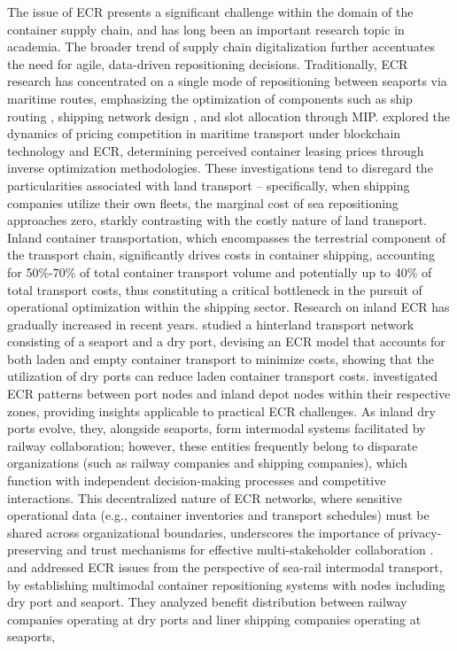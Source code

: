 \documentclass[preprint,12pt]{elsarticle}
\begin{document}
The issue of ECR presents a significant challenge within the domain of the container supply chain, and has long been an important research topic in academia. The broader trend of supply chain digitalization \citep{huImpactSupplyChain2026} further accentuates the need for agile, data-driven repositioning decisions. Traditionally, ECR research has concentrated on a single mode of repositioning between seaports via maritime routes, emphasizing the optimization of components such as ship routing \citep{xiangLinerFleetDeployment2024,xiangTacticalVesselDeployment2024,xuEmptyContainerRepositioning2024}, shipping network design \citep{kuzmiczContainerDepotLocation2020, shanExactAlgorithmInland2020, zhangTacticalOperationalCooperative2019}, and slot allocation \citep{liangDynamicContainerSlot2024} through MIP. \citet{yuPricingCompetitionMaritime2024} explored the dynamics of pricing competition in maritime transport under blockchain technology and ECR, determining perceived container leasing prices through inverse optimization methodologies. These investigations tend to disregard the particularities associated with land transport – specifically, when shipping companies utilize their own fleets, the marginal cost of sea repositioning approaches zero, starkly contrasting with the costly nature of land transport. Inland container transportation, which encompasses the terrestrial component of the transport chain, significantly drives costs in container shipping, accounting for 50\%-70\% of total container transport volume and potentially up to 40\% of total transport costs, thus constituting a critical bottleneck in the pursuit of operational optimization within the shipping sector. Research on inland ECR has gradually increased in recent years. \citet{faziMultitripContainerDrayage2023} studied a hinterland transport network consisting of a seaport and a dry port, devising an ECR model that accounts for both laden and empty container transport to minimize costs, showing that the utilization of dry ports can reduce laden container transport costs. \citet{caiJointOptimizationEmpty2024} investigated ECR patterns between port nodes and inland depot nodes within their respective zones, providing insights applicable to practical ECR challenges. As inland dry ports evolve, they, alongside seaports, form intermodal systems facilitated by railway collaboration; however, these entities frequently belong to disparate organizations (such as railway companies and shipping companies), which function with independent decision-making processes and competitive interactions. This decentralized nature of ECR networks, where sensitive operational data (e.g., container inventories and transport schedules) must be shared across organizational boundaries, underscores the importance of privacy-preserving and trust mechanisms for effective multi-stakeholder collaboration \citep{addulaNovelPermissionedBlockchain2025}. \citet{luoEmptyContainerRepositioning2019} and \citet{xieEmptyContainerManagement2017} addressed ECR issues from the perspective of sea-rail intermodal transport, by establishing multimodal container repositioning systems with nodes including dry port and seaport. They analyzed benefit distribution between railway companies operating at dry ports and liner shipping companies operating at seaports, 
\end{document}
